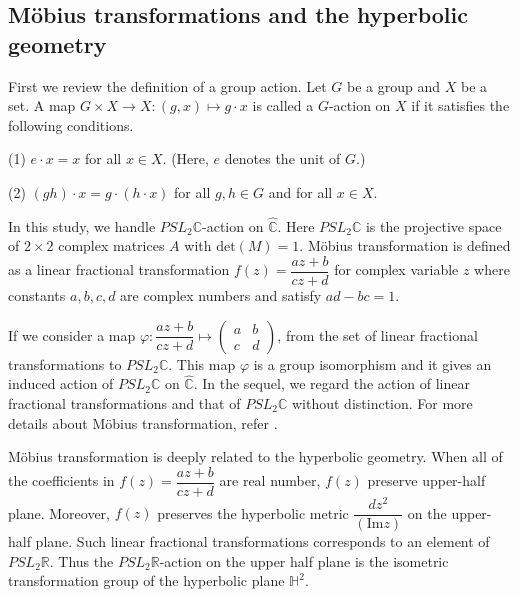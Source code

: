 \subsection{M\"obius transformations and the hyperbolic geometry}

First we review the definition of a group action. 
Let $G$ be a group and $X$ be a set. A map $G \times X \to X : (g,x) \mapsto g\cdot x$
is called a $G$-action on $X$ if it satisfies the following conditions.
\par \qquad (1) $e \cdot x = x$ for all $x \in X$. (Here, $e$ denotes the unit of $G$.)
\par \qquad (2) $(gh) \cdot x = g \cdot (h\cdot x)$ for all $g, h \in G$ and for all $x \in X$.

In this study, we handle $PSL_2\mathbb{C}$-action on $\hat{\mathbb{C}}$.
Here $PSL_2\mathbb{C}$ is the projective space of $2 \times 2$ complex matrices $A$ with $\mathrm{det}(M)=1$.
M\"obius transformation is defined as a linear fractional transformation
$f(z)=\dfrac{az+b}{cz+d}$ for complex variable $z$ where constants
$a, b, c, d$ are complex numbers and satisfy $ad - bc = 1$.

If we consider a map $\varphi: \dfrac{az+b}{cz+d} \mapsto \begin{pmatrix}a & b \\ c& d \end{pmatrix}$,
from the set of linear fractional transformations to $PSL_2\mathbb{C}$.
This map $\varphi$ is a group isomorphism and it gives an induced action of $PSL_2\mathbb{C}$ on $\hat{\mathbb{C}}$.
In the sequel, we regard the action of linear fractional transformations
and that of $PSL_2\mathbb{C}$ without distinction.
For more details about M\"obius transformation, refer
\cite{MumfordSeriesWright200204}\cite{marden_2016}.

M\"obius transformation is deeply related to the hyperbolic geometry.
When all of the coefficients in $f(z) = \dfrac{az + b}{cz + d}$
are real number, $f(z)$ preserve upper-half plane.
Moreover, $f(z)$ preserves the hyperbolic metric $\dfrac{dz^2}{(\mathrm{Im}z)}$
on the upper-half plane.
Such linear fractional transformations corresponds to an element of $PSL_2\mathbb{R}$.
Thus the $PSL_2\mathbb{R}$-action on the upper half plane is
the isometric transformation group of the hyperbolic plane $\mathbb{H}^2$.

